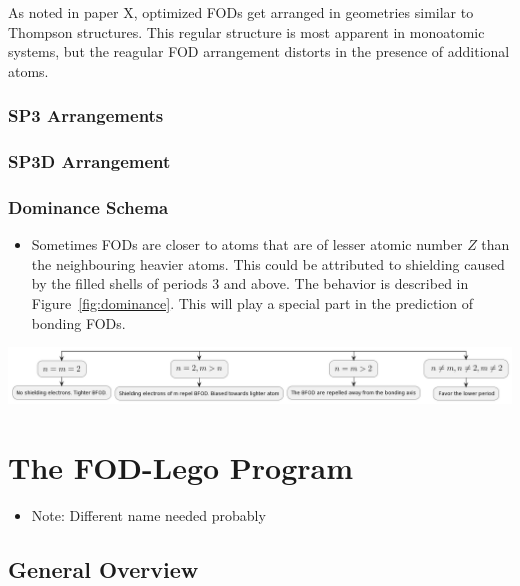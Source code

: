 \documentclass[12pt,a4paper,]{report}
\let\origfigure=\figure
\let\endorigfigure=\endfigure
\renewenvironment{figure}[1][]{%
\origfigure[H]
}{%
\endorigfigure
}
\providecommand{\tightlist}{%
  \setlength{\itemsep}{0pt}\setlength{\parskip}{0pt}}
\begin{document}
As noted in paper X, optimized FODs get arranged in geometries similar
to Thompson structures. This regular structure is most apparent in
monoatomic systems, but the reagular FOD arrangement distorts in the
presence of additional atoms.

\subsection{SP3 Arrangements}\label{sp3-arrangements}

\subsection{SP3D Arrangement}\label{sp3d-arrangement}

\subsection{Dominance Schema}\label{dominance-schema}

\begin{itemize}
\tightlist
\item
  Sometimes FODs are closer to atoms that are of lesser atomic number
  \(Z\) than the neighbouring heavier atoms. This could be attributed to
  shielding caused by the filled shells of periods 3 and above. The
  behavior is described in Figure~\ref{fig:dominance}. This will play a
  special part in the prediction of bonding FODs.
\end{itemize}

\begin{figure}
\hypertarget{fig:dominance}{%
\centering
\includegraphics{source/figures/dominance.png}
\caption{dominance}\label{fig:dominance}
}
\end{figure}

\chapter{The FOD-Lego Program}\label{the-fod-lego-program}

\begin{itemize}
\tightlist
\item
  Note: Different name needed probably
\end{itemize}

\section{General Overview}\label{general-overview}
\end{document}
